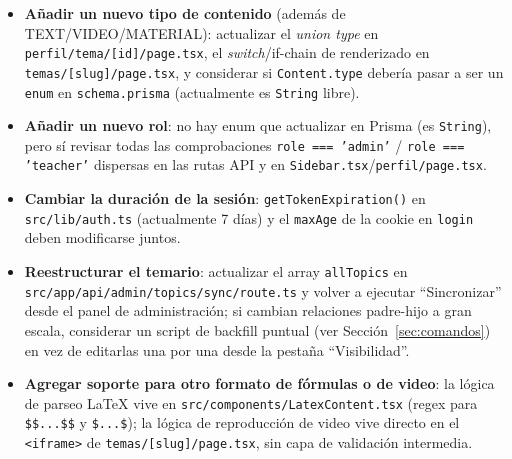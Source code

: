 \documentclass[11pt,a4paper]{article}
\newcommand{\code}[1]{\texttt{#1}}
\begin{document}
\begin{itemize}
  \item \textbf{Añadir un nuevo tipo de contenido} (además de TEXT/VIDEO/MATERIAL): actualizar el \emph{union type} en \code{perfil/tema/[id]/page.tsx}, el \emph{switch}/if-chain de renderizado en \code{temas/[slug]/page.tsx}, y considerar si \code{Content.type} debería pasar a ser un \code{enum} en \code{schema.prisma} (actualmente es \code{String} libre).
  \item \textbf{Añadir un nuevo rol}: no hay enum que actualizar en Prisma (es \code{String}), pero sí revisar todas las comprobaciones \code{role === 'admin'} / \code{role === 'teacher'} dispersas en las rutas API y en \code{Sidebar.tsx}/\code{perfil/page.tsx}.
  \item \textbf{Cambiar la duración de la sesión}: \code{getTokenExpiration()} en \code{src/lib/auth.ts} (actualmente 7 días) y el \code{maxAge} de la cookie en \code{login} deben modificarse juntos.
  \item \textbf{Reestructurar el temario}: actualizar el array \code{allTopics} en \code{src/app/api/admin/topics/sync/route.ts} y volver a ejecutar ``Sincronizar'' desde el panel de administración; si cambian relaciones padre-hijo a gran escala, considerar un script de backfill puntual (ver Sección~\ref{sec:comandos}) en vez de editarlas una por una desde la pestaña ``Visibilidad''.
  \item \textbf{Agregar soporte para otro formato de fórmulas o de video}: la lógica de parseo LaTeX vive en \code{src/components/LatexContent.tsx} (regex para \code{\$\$...\$\$} y \code{\$...\$}); la lógica de reproducción de video vive directo en el \code{<iframe>} de \code{temas/[slug]/page.tsx}, sin capa de validación intermedia.
\end{itemize}
\end{document}
